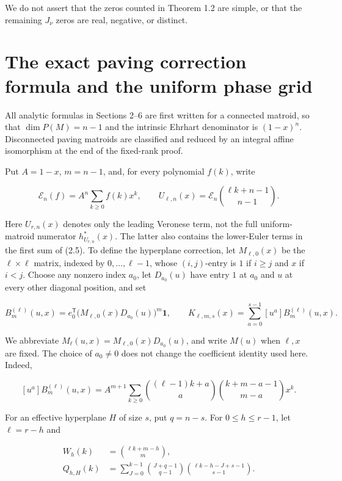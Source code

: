 \documentclass[10pt]{article}
\begin{document}
We do not assert that the zeros counted in Theorem 1.2 are simple, or that
the remaining $J_\nu$ zeros are real, negative, or distinct.

\section{The exact paving correction formula and the uniform phase grid}


All analytic formulas in Sections 2--6 are first written for a connected
matroid, so that $\dim P(M)=n-1$ and the intrinsic Ehrhart denominator is
$(1-x)^n$.  Disconnected paving matroids are classified and reduced by an
integral affine isomorphism at the end of the fixed-rank proof.

Put $A=1-x$, $m=n-1$, and, for every polynomial $f(k)$, write

\[
 \mathcal E_n(f)=A^n\sum_{k\ge0}f(k)x^k,
 \qquad
 U_{\ell,n}(x)=\mathcal E_n\!\binom{\ell k+n-1}{n-1}. \tag{2.1}
\]

Here $U_{r,n}(x)$ denotes only the leading Veronese term, not the full
uniform-matroid numerator $h_{U_{r,n}}^*(x)$.  The latter also contains
the lower-Euler terms in the first sum of (2.5).
To define the hyperplane correction, let
$M_{\ell,0}(x)$ be the $\ell\times\ell$ matrix, indexed by
$0,\ldots,\ell-1$, whose $(i,j)$-entry is $1$ if $i\ge j$ and $x$
if $i<j$.  Choose any nonzero index $a_0$, let $D_{a_0}(u)$ have entry
$1$ at $a_0$ and $u$ at every other diagonal position, and set

\[
 B_m^{(\ell)}(u,x)
   =e_0^{\mathsf T}\bigl(M_{\ell,0}(x)D_{a_0}(u)\bigr)^m\mathbf 1,
 \qquad
 K_{\ell,m,s}(x)=\sum_{a=0}^{s-1}[u^a]B_m^{(\ell)}(u,x). \tag{2.2}
\]

We abbreviate
$M_\ell(u,x)=M_{\ell,0}(x)D_{a_0}(u)$, and write $M(u)$ when
$\ell,x$ are fixed.
The choice of $a_0\ne0$ does not change the coefficient identity used here.
Indeed,

\[
 [u^a]B_m^{(\ell)}(u,x)
 =A^{m+1}\sum_{k\ge0}
   \binom{(\ell-1)k+a}{a}
   \binom{k+m-a-1}{m-a}x^k. \tag{2.3}
\]

For an effective hyperplane $H$ of size $s$, put $q=n-s$.  For
$0\le h\le r-1$, let $\ell=r-h$ and

\[
 \begin{aligned}
  W_h(k)&=\binom{\ell k+m-h}{m},\\
  Q_{h,H}(k)&=\sum_{J=0}^{k-1}
       \binom{J+q-1}{q-1}
       \binom{\ell k-h-J+s-1}{s-1}.
 \end{aligned} \tag{2.4}
\]
\end{document}
